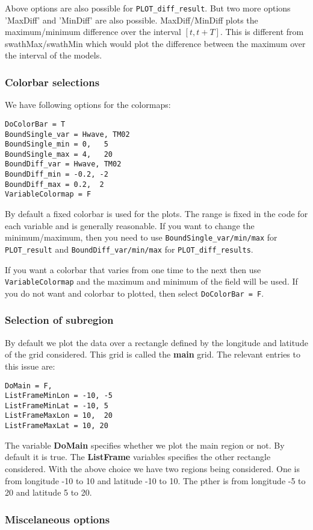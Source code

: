 \documentclass[12pt]{amsart}
\begin{document}
Above options are also possible for {\tt PLOT\_diff\_result}. But two more options 'MaxDiff' and 'MinDiff' are also possible. MaxDiff/MinDiff plots the maximum/minimum difference over the interval $[t, t+T]$. This is different from swathMax/swathMin which would plot the difference between the maximum over the interval of the models.

\subsubsection{Colorbar selections}
We have following options for the colormaps:
\begin{verbatim}
DoColorBar = T
BoundSingle_var = Hwave, TM02
BoundSingle_min = 0,   5
BoundSingle_max = 4,   20
BoundDiff_var = Hwave, TM02
BoundDiff_min = -0.2, -2
BoundDiff_max = 0.2,  2
VariableColormap = F
\end{verbatim}
By default a fixed colorbar is used for the plots. The range is fixed in the code for each variable and is generally reasonable. If you want to change the minimum/maximum, then you need to use {\tt BoundSingle\_var/min/max} for {\tt PLOT\_result} and {\tt BoundDiff\_var/min/max} for {\tt PLOT\_diff\_results}.

If you want a colorbar that varies from one time to the next then use {\tt VariableColormap} and the maximum and minimum of the field will be used. If you do not want and colorbar to plotted, then select {\tt DoColorBar = F}.


\subsubsection{Selection of subregion}
By default we plot the data over a rectangle defined by the longitude and latitude of the grid considered. This grid is called the {\bf main} grid.
The relevant entries to this issue are:
\begin{verbatim}
DoMain = F,
ListFrameMinLon = -10, -5
ListFrameMinLat = -10, 5
ListFrameMaxLon = 10,  20
ListFrameMaxLat = 10, 20
\end{verbatim}
The variable {\bf DoMain} specifies whether we plot the main region or not. By default it is true.
The {\bf ListFrame} variables specifies the other rectangle considered. With the above choice we have two regions being considered. One is from longitude -10 to 10 and latitude -10 to 10. The pther is from longitude -5 to 20 and latitude 5 to 20.



\subsubsection{Miscelaneous options}
\end{document}
